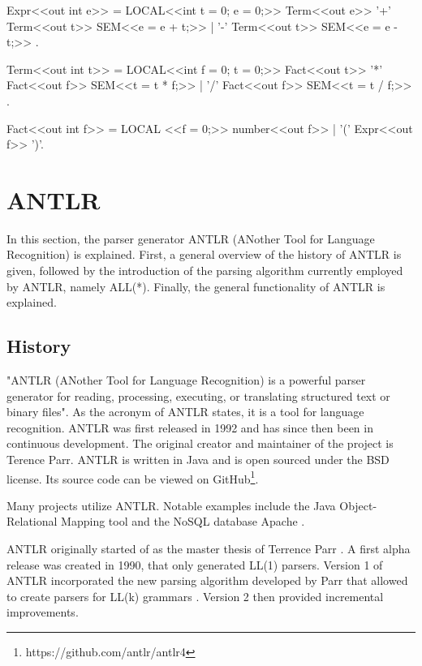 \begin{GenericCode}[float,numbers=none,caption=Attributed Grammar for Coco-2 for simple arithmetic expressions., label=lst:Coco2ATG]
Expr<<out int e>> =    LOCAL<<int t = 0; e = 0;>>
  Term<<out e>>             
  { '+' Term<<out t>>    SEM<<e = e + t;>>
  | '-' Term<<out t>>    SEM<<e = e - t;>>
  }.

Term<<out int t>> =    LOCAL<<int f = 0; t = 0;>>
  Fact<<out t>>
  { '*' Fact<<out f>>  SEM<<t = t * f;>>
  | '/' Fact<<out f>>  SEM<<t = t / f;>>
  }.
  
Fact<<out int f>> =    LOCAL <<f = 0;>>
    number<<out f>>
  | '(' Expr<<out f>> ')'.

\end{GenericCode}

\section{ANTLR}

In this section, the parser generator ANTLR (ANother Tool for Language Recognition) is explained. First, a general overview of the history of ANTLR is given, followed by the introduction of the parsing algorithm currently employed by ANTLR, namely ALL(*). Finally, the general functionality of ANTLR is explained.  

\subsection{History}

"ANTLR (ANother Tool for Language Recognition) is a powerful parser generator for reading, processing, executing, or translating structured text or binary files". As the acronym of ANTLR states, it is a tool for language recognition. ANTLR was first released in 1992 and has since then been in continuous development. The original creator and maintainer of the project is Terence Parr. ANTLR is written in Java and is open sourced under the BSD license. Its source code can be viewed on GitHub\footnote{https://github.com/antlr/antlr4}. 

Many projects utilize ANTLR. Notable examples include the Java Object-Relational Mapping tool \cite{HibernateWeb2024} and the NoSQL database Apache \textcite{Cassandra2024}.

ANTLR originally started of as the master thesis of Terrence Parr \parencite{PCCTSHistory1994}. A first alpha release was created in 1990, that only generated LL(1) parsers. Version 1 of ANTLR incorporated the new parsing algorithm developed by Parr that allowed to create parsers for LL(k) grammars \parencite{parrPhd1993}. Version 2 then provided incremental improvements.   

